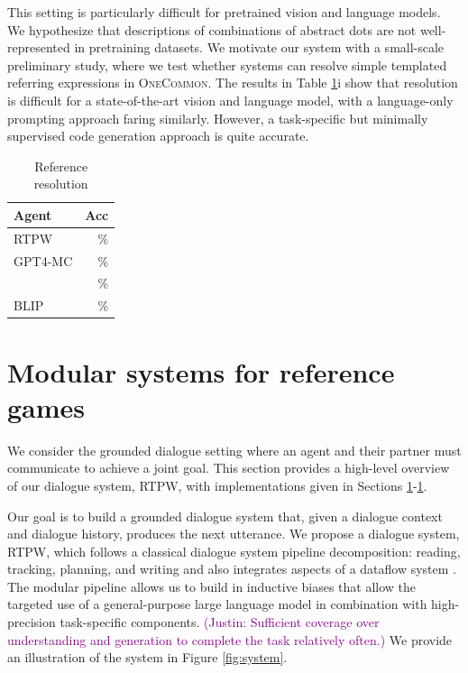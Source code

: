 \documentclass[11pt]{article}
\newcommand{\system}{RTPW}
\newcommand{\justin}[1]{{{\textcolor{purple}{(Justin: #1)}}}}
\begin{document}
This setting is particularly difficult for pretrained vision and language models.
We hypothesize that descriptions of combinations of abstract dots are not
well-represented in pretraining datasets.
We motivate our system with a small-scale preliminary study, where we
test whether systems can resolve simple templated referring expressions
in \textsc{OneCommon}.
The results in Table \ref{tbl:refres}i show that
resolution is difficult for a state-of-the-art vision and language model,
with a language-only prompting approach faring similarly.
However, a task-specific but minimally supervised code generation approach
is quite accurate.

\begin{table}[!t]
\centering
\begin{tabular}{lr}
\toprule
Agent                   & Acc\\
\midrule
\system{}               & \%  \\
GPT4-MC                 & \%  \\
\citet{fried}           & \%  \\
BLIP                    & \%  \\
\bottomrule
\end{tabular}
\caption{\label{tbl:refres}
Reference resolution
}
\end{table}

\section{Modular systems for reference games}
We consider the grounded dialogue setting where an agent and their partner
must communicate to achieve a joint goal.
This section provides a high-level overview of our dialogue system, \system{},
with implementations given in Sections \ref{}-\ref{}.

Our goal is to build a grounded dialogue system that,
given a dialogue context and dialogue history,
produces the next utterance.
We propose a dialogue system, \system{},
which follows a classical dialogue system pipeline decomposition:
reading, tracking, planning, and writing \citep{young2006pomdp,young2013pomdpsurvey,he2018dnd}
and also integrates aspects of a dataflow system \citep{sm}.
The modular pipeline allows us to build in inductive biases that allow the targeted use of
a general-purpose large language model in combination with high-precision task-specific components.
\justin{Sufficient coverage over understanding and generation to complete the task relatively often.}
We provide an illustration of the system in Figure \ref{fig:system}.
\end{document}
